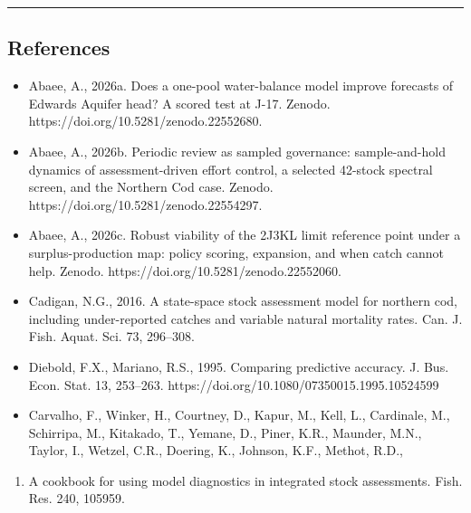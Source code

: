 \documentclass[11pt]{article}
\providecommand{\tightlist}{\setlength{\itemsep}{0.2em}\setlength{\parskip}{0pt}}
\begin{document}
\begin{center}\rule{0.5\linewidth}{0.5pt}\end{center}

\subsection{References}\label{references}

\begin{itemize}
\item
  Abaee, A., 2026a. Does a one-pool water-balance model improve
  forecasts of Edwards Aquifer head? A scored test at J-17. Zenodo.
  https://doi.org/10.5281/zenodo.22552680.
\item
  Abaee, A., 2026b. Periodic review as sampled governance:
  sample-and-hold dynamics of assessment-driven effort control, a
  selected 42-stock spectral screen, and the Northern Cod case. Zenodo.
  https://doi.org/10.5281/zenodo.22554297.
\item
  Abaee, A., 2026c. Robust viability of the 2J3KL limit reference point
  under a surplus-production map: policy scoring, expansion, and when
  catch cannot help. Zenodo. https://doi.org/10.5281/zenodo.22552060.
\item
  Cadigan, N.G., 2016. A state-space stock assessment model for northern
  cod, including under-reported catches and variable natural mortality
  rates. Can. J. Fish. Aquat. Sci. 73, 296--308.
\item
  Diebold, F.X., Mariano, R.S., 1995. Comparing predictive accuracy. J.
  Bus. Econ. Stat. 13, 253--263.
  https://doi.org/10.1080/07350015.1995.10524599
\item
  Carvalho, F., Winker, H., Courtney, D., Kapur, M., Kell, L.,
  Cardinale, M., Schirripa, M., Kitakado, T., Yemane, D., Piner, K.R.,
  Maunder, M.N., Taylor, I., Wetzel, C.R., Doering, K., Johnson, K.F.,
  Methot, R.D.,
\end{itemize}

\begin{enumerate}
\def\labelenumi{\arabic{enumi}.}
\setcounter{enumi}{2020}
\tightlist
\item
  A cookbook for using model diagnostics in integrated stock
  assessments. Fish. Res. 240, 105959.
\end{enumerate}
\end{document}
